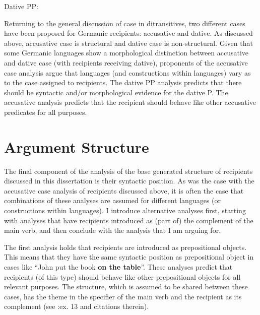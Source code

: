 \begin{exe}
\ex Dative PP: \\
\end{exe}

Returning to the general discussion of case in ditransitives, two different cases have been proposed for Germanic recipients: accusative and dative. As discussed above, accusative case is structural and dative case is non-structural. Given that some Germanic languages show a morphological distinction between accusative and dative case (with recipients receiving dative), proponents of the accusative case analysis argue that languages (and constructions within languages) vary as to the case assigned to recipients. The dative PP analysis predicts that there should be syntactic and/or morphological evidence for the dative P. The accusative analysis predicts that the recipient should behave like other accusative predicates for all purposes.

\section{Argument Structure}
The final component of the analysis of the base generated structure of recipients discussed in this dissertation is their syntactic position. As was the case with the accusative case analysis of recipients discussed above, it is often the case that combinations of these analyses are assumed for different languages (or constructions within languages). I introduce alternative analyses first, starting with analyses that have recipients introduced as (part of) the complement of the main verb, and then conclude with the analysis that I am arguing for.

The first analysis holds that recipients are introduced as prepositional objects. This means that they have the same syntactic position as prepositional object in cases like ``John put the book \textbf{on the table}''. These analyses predict that recipients (of this type) should behave like other prepositional objects for all relevant purposes. The structure, which is assumed to be shared between these cases, has the theme in the specifier of the main verb and the recipient as its complement (see \citealt{Larson.1988}:ex. 13 and citations therein).


